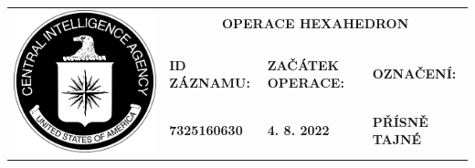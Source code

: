 \documentclass[a4paper, 11pt]{article}
\newcommand{\blackcell}{\cellcolor{black} \color{white} \ttfamily \bfseries}
\begin{document}
	
	\noindent
	\begin{table}[H]
		\renewcommand\tabularxcolumn[1]{m{#1}}
		\def\arraystretch{1.5}
		\begin{tabularx}{\textwidth}{l X X X}
			\multirow{4}{*}{ \includegraphics[scale=0.22]{sources/CIA_logo.pdf} } & \multicolumn{3}{c}{\bfseries \ttfamily \Huge OPERACE HEXAHEDRON} \\
			&&&\\
			& \blackcell ID ZÁZNAMU: & \blackcell ZAČÁTEK OPERACE: & \blackcell OZNAČENÍ: \\
			& \blackcell 7325160630 & \blackcell 4. 8. 2022 & \blackcell PŘÍSNĚ TAJNÉ \\
			
		\end{tabularx}
	\end{table}
	
\end{document}
